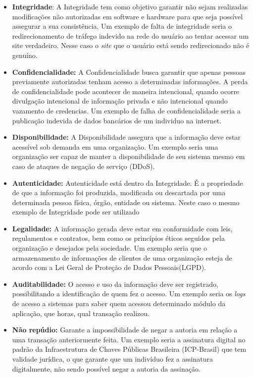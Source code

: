 \begin{itemize}
   \item \textbf{Integridade}: A Integridade tem como objetivo garantir não sejam realizadas modificações não autorizadas em software e hardware para que seja possível assegurar a sua consistência. Um exemplo de falta de integridade seria o redirecionamento de tráfego indevido na rede do usuário ao tentar acessar um site verdadeiro. Nesse caso o \textit{site} que o usuário está sendo redirecionado não é genuíno.
    
   \item \textbf{Confidencialidade:} A Confidencialidade busca garantir que apenas pessoas previamente autorizadas tenham acesso a determinadas informações. A perda de confidencialidade pode acontecer de maneira intencional, quando ocorre divulgação intencional de informação privada e não intencional quando vazamento de credencias. Um exemplo de falha de confidencialidade seria a publicação indevida de dados bancários de um individuo na internet.
   
        
   \item \textbf{Disponibilidade:} A Disponibilidade assegura que a informação deve estar acessível sob demanda em uma organização. Um exemplo seria uma organização ser capaz de manter a disponibilidade de seu sistema mesmo em caso de ataques de negação de serviço (DDoS). 
        
   \item \textbf{Autenticidade: }Autenticidade está dentro da Integridade. É a propriedade de que a informação foi produzida, modificada ou descartada por uma determinada pessoa física, órgão, entidade ou sistema. Neste caso o mesmo exemplo de Integridade pode ser utilizado
    
   \item \textbf{Legalidade:} A informação gerada deve estar em conformidade com leis, regulamentos e contratos, bem como os princípios éticos seguidos pela organização e desejados pela sociedade. Um exemplo seria que o armazenamento de informações de clientes de uma organização esteja de acordo com a Lei Geral de Proteção de Dados Pessoais(LGPD).
    
   \item \textbf{Auditabilidade:} O acesso e uso da informação deve ser registrado, possibilitando a identificação de quem fez o acesso. Um exemplo seria os \textit{logs} de acesso a sistemas para saber quem acessou determinado módulo da aplicação, que horas, qual transação realizou.
    
   \item\textbf{ Não repúdio:} Garante a impossibilidade de negar a autoria em relação a uma transação anteriormente feita. Um exemplo seria a assinatura digital no padrão da Infraestrutura de Chaves Públicas Brasileira (ICP-Brasil) que tem validade jurídica, o que garante que um indivíduo fez a assinatura digitalmente, não sendo possível negar a autoria da assinação.
    
    
\end{itemize}




